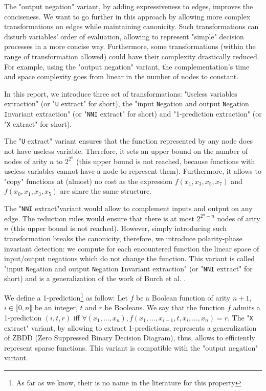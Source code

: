 \documentclass[a4paper,10pt]{article}
\newcommand{\Uextract}{"\texttt{U}seless variables extraction"}
\newcommand{\uextract}{"\texttt{U} extract"}
\newcommand{\NNIextract}{"input \texttt{N}egation and output \texttt{N}egation \texttt{I}nvariant extraction"}
\newcommand{\nniextract}{"\texttt{NNI} extract"}
\newcommand{\Xextract}{"1-prediction extraction"}
\newcommand{\xextract}{"\texttt{X} extract"}
\newcommand{\GroBdd}{\texttt{GROBDD}}
\begin{document}
The "output negation" variant, by adding expressiveness to edges, improves the conciseness.
We want to go further in this approach by allowing more complex transformations on edges while maintaining canonicity.
Such transformations can disturb variables' order of evaluation, allowing to represent "simple" decision processes in a more concise way.
Furthermore, some transformations (within the range of transformation allowed) could have their complexity drastically reduced.
For example, using the "output negation" variant, the complementation's time and space complexity goes from linear in the number of nodes to constant.


In this report, we introduce three set of transformations: \Uextract{} (or \uextract{} for short), the \NNIextract{} (or \nniextract{} for short) and \Xextract{} (or \xextract{} for short).


The \uextract{} variant ensures that the function represented by any node does not have useless variable.
Therefore, it sets an upper bound on the number of nodes of arity $n$ to $2^{2^n}$ (this upper bound is not reached, because functions with useless variables cannot have a node to represent them).
Furthermore, it allows to "copy" functions at (almost) no cost as the expression $f(x_1, x_3, x_5, x_7)$ and $f(x_0, x_1, x_3, x_5)$ are share the same structure.


The \nniextract variant would allow to complement inputs and output on any edge.
The reduction rules would ensure that there is at most $2^{2^n-n}$ nodes of arity $n$ (this upper bound is not reached).
However, simply introducing such transformation breaks the canonicity, therefore, we introduce polarity-phase invariant detection: we compute for each encountered function the linear space of input/output negations which do not change the function.
This variant is called \NNIextract{} (or \nniextract{} for short) and is a generalization of the work of Burch et al. \cite{BurchLong1992}.

We define a 1-prediction\footnote{As far as we know, their is no name in the literature for this property} as follow:
Let $f$ be a Boolean function of arity $n+1$, $i\in\llbracket 0, n\rrbracket$ be an integer, $t$ and $r$ be Booleans.
We say that the function $f$ admits a 1-prediction $(i, t, r)$ iff $\forall (x_1, \dots, x_n), f(x_1, \dots, x_{i-1}, t, x_i, \dots, x_n) = r$.
The \xextract{} variant, by allowing to extract 1-predictions, represents a generalization of ZBDD (Zero Suppressed Binary Decision Diagram), thus, allows to efficiently represent sparse functions.
This variant is compatible with the "output negation" variant.
\end{document}
